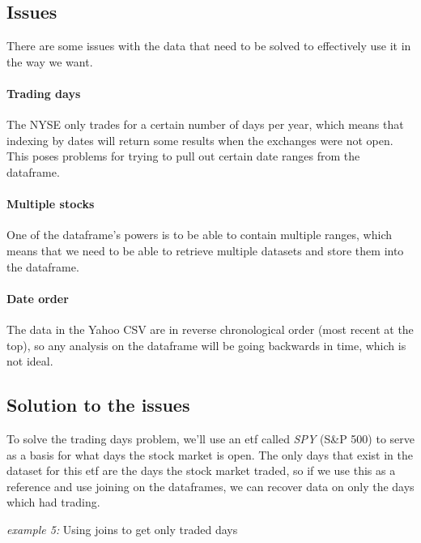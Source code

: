 \subsection{Issues}
\noindent There are some issues with the data that need to be solved to effectively use it in the way we want.

\paragraph{Trading days} The NYSE only trades for a certain number of days per year, which means that indexing by dates will return some results when the exchanges were not open. This poses problems for trying to pull out certain date ranges from the dataframe.

\paragraph{Multiple stocks} One of the dataframe's powers is to be able to contain multiple ranges, which means that we need to be able to retrieve multiple datasets and store them into the dataframe.

\paragraph{Date order} The data in the Yahoo CSV are in reverse chronological order (most recent at the top), so any analysis on the dataframe will be going backwards in time, which is not ideal.

\subsection{Solution to the issues}
\noindent To solve the trading days problem, we'll use an \ac{etf} called \textit{SPY} (S\&P 500) to serve as a basis for what days the stock market is open. The only days that exist in the dataset for this \ac{etf} are the days the stock market traded, so if we use this as a reference and use joining on the dataframes, we can recover data on only the days which had trading.\\

\noindent\begin{minipage}{\linewidth}
\noindent\textit{example 5:} Using joins to get only traded days


\end{minipage}

